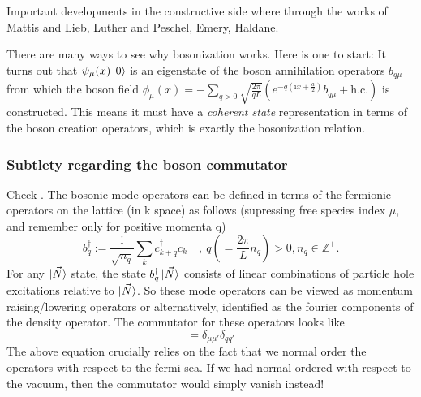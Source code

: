 \documentclass{article}
\renewcommand{\i}{\mathrm{i}}
\renewcommand{\i}{\mathrm{i}}
\begin{document}
Important developments in the constructive side where through the works of Mattis and Lieb, Luther and Peschel, Emery, Haldane.

There are many ways to see why bosonization works. Here is one to start: It turns out that $\psi_{\mu} (x) \ket{0}$ is an eigenstate of the boson annihilation operators $b_{q\mu}$ from which the boson field $\phi_{\mu} (x) = - \sum_{q>0} \sqrt{\frac{2\pi}{qL}}\left(e^{-q(\i x + \frac{a}{2})} b_{q\mu} + \text{h.c.} \right)$ is constructed. This means it must have a \emph{coherent state} representation in terms of the boson creation operators, which is exactly the bosonization relation.

\subsubsection{Subtlety regarding the boson commutator}
Check \cite{von1998bosonization, 656563}.
The bosonic mode operators can be defined in terms of the fermionic operators on the lattice (in k space) as follows (supressing free species index $\mu$, and remember only for positive momenta q)
\begin{equation}
    b_{q}^{\dagger} := \frac{\i}{\sqrt{n_q}} \sum_{k} c^{\dagger}_{k+q} c_{k} \quad,~ q \left(=\frac{2\pi}{L} n_q\right) >0,  n_q \in \mathbb{Z}^+.
\end{equation}
For any $\ket{\vec{N}}$ state, the state $b_q^{\dagger} \ket{\vec{N}}$ consists of linear combinations of particle hole excitations relative to $\ket{\vec{N}}$. So these mode operators can be viewed as momentum raising/lowering operators or alternatively, identified as the fourier components of the density operator.
The commutator for these operators looks like
\begin{equation}
[b_{q\mu}, b_{q' \mu'}] = \delta_{\mu \mu'} \delta_{q q'}
\end{equation}
The above equation crucially relies on the fact that we normal order the operators with respect to the fermi sea. If we had normal ordered with respect to the vacuum, then the commutator would simply vanish instead!
\end{document}
